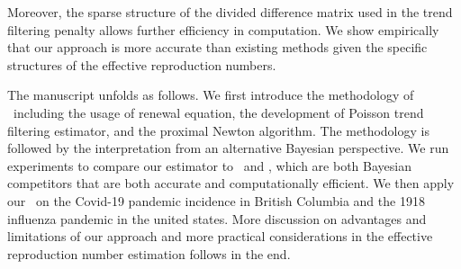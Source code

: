 Moreover, the sparse structure of the divided difference matrix used in the trend filtering penalty allows further efficiency in computation. 
We show empirically that our approach is more accurate than existing methods given the specific structures of the effective reproduction numbers. 

The manuscript unfolds as follows. We first introduce the methodology of \RtEstim\ including the usage of renewal equation, the development of Poisson trend filtering estimator, and the proximal Newton algorithm. The methodology is followed by the interpretation from an alternative Bayesian perspective. We run experiments to compare our estimator to \EpiEstim\ and \EpiLPS, which are both Bayesian competitors that are both accurate and computationally efficient. We then apply our \RtEstim\ on the Covid-19 pandemic incidence in British Columbia and the 1918 influenza pandemic in the united states. More discussion on advantages and limitations of our approach and more practical considerations in the effective reproduction number estimation follows in the end. 
